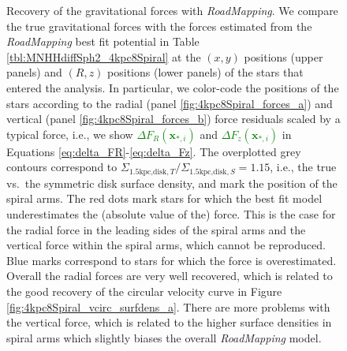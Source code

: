 \documentclass[iop,revtex4,numberedappendix,appendixfloats]{emulateapj}
\newcommand{\vect}[1]{\boldsymbol{#1}}
\newcommand{\RM}{{\sl RoadMapping}}
\newcommand{\NEW}[1]{\textcolor{Green}{#1}}
\newcommand{\OLD}[1]{}
\begin{document}
\begin{figure}[!htbp]
\caption{Recovery of the gravitational forces with \RM{}. We compare the true gravitational forces with the forces estimated from the \RM{} best fit potential in Table \ref{tbl:MNHHdiffSph2_4kpc8Spiral} at the $(x,y)$ positions (upper panels) and $(R,z)$ positions (lower panels) of the stars that entered the analysis. In particular, we color-code the positions of the stars according to the radial (panel \ref{fig:4kpc8Spiral_forces_a}) and vertical (panel \ref{fig:4kpc8Spiral_forces_b}) force residuals scaled by a typical force, i.e., we show \OLD{$\Delta F_R(*_i)$}\NEW{$\Delta F_R(\vect{x}_{*,i})$} and \OLD{$\Delta F_z(*_i)$}\NEW{$\Delta F_z(\vect{x}_{*,i})$} in Equations \eqref{eq:delta_FR}-\eqref{eq:delta_Fz}. The overplotted grey contours correspond to $\Sigma_{\text{1.5kpc,disk},T}/\Sigma_{\text{1.5kpc,disk},S}=1.15$, i.e., the true vs.\ the symmetric disk surface density, and mark the position of the spiral arms. The red dots mark stars for which the best fit model underestimates the (absolute value of the) force. This is the case for the radial force in the leading sides of the spiral arms and the vertical force within the spiral arms, which cannot be reproduced. Blue marks correspond to stars for which the force is overestimated. Overall the radial forces are very well recovered, which is related to the good recovery of the circular velocity curve in Figure \ref{fig:4kpc8Spiral_vcirc_surfdens_a}. There are more problems with the vertical force, which is related to the higher surface densities in spiral arms which slightly biases the overall \RM{} model.}
\label{fig:4kpc8Spiral_forces}
\end{figure}
\end{document}
